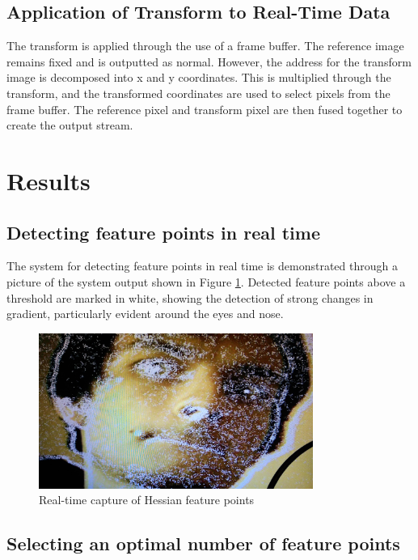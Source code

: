 \documentclass{article}
\begin{document}
\subsection{Application of Transform to Real-Time Data}

The transform is applied through the use of a frame buffer. The reference image remains fixed and is outputted as normal. However, the address for the transform image is decomposed into x and y coordinates. This is multiplied through the transform, and the transformed coordinates are used to select pixels from the frame buffer. The reference pixel and transform pixel are then fused together to create the output stream.

\section{Results}

\subsection{Detecting feature points in real time}

The system for detecting feature points in real time is demonstrated through a picture of the system output shown in Figure \ref{fig_pic_features}. Detected feature points above a threshold are marked in white, showing the detection of strong changes in gradient, particularly evident around the eyes and nose.

\begin{figure}[h]
	\centering
	\includegraphics[width=0.8\textwidth]{figures/pictures/features}
	\caption{Real-time capture of Hessian feature points}
	\label{fig_pic_features}
\end{figure}

\subsection{Selecting an optimal number of feature points}
\end{document}
